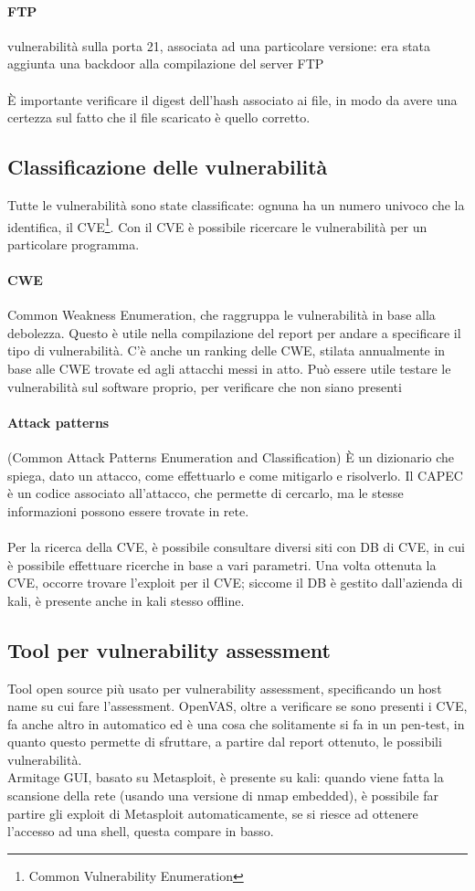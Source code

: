 \documentclass{article}
\begin{document}
\paragraph{FTP}vulnerabilità sulla porta 21, associata ad una particolare versione: era stata aggiunta una backdoor alla compilazione del server FTP
\\\\ È importante verificare il digest dell'hash associato ai file, in modo da avere una certezza sul fatto che il file scaricato è quello corretto.
\subsection{Classificazione delle vulnerabilità}
Tutte le vulnerabilità sono state classificate: ognuna ha un numero univoco che la identifica, il CVE\footnote{Common Vulnerability Enumeration}. Con il CVE è possibile ricercare le vulnerabilità per un particolare programma.
\paragraph{CWE} Common Weakness Enumeration, che raggruppa le vulnerabilità in base alla debolezza. Questo è utile nella compilazione del report per andare a specificare il tipo di vulnerabilità. C'è anche un ranking delle CWE, stilata annualmente in base alle CWE trovate ed agli attacchi messi in atto. Può essere utile testare le vulnerabilità sul software proprio, per verificare che non siano presenti
\paragraph{Attack patterns}
(Common Attack Patterns Enumeration and Classification) È un dizionario che spiega, dato un attacco, come effettuarlo e come mitigarlo e risolverlo. Il CAPEC è un codice associato all'attacco, che permette di cercarlo, ma le stesse informazioni possono essere trovate in rete.\\\\ Per la ricerca della CVE, è possibile consultare diversi siti con DB di CVE, in cui è possibile effettuare ricerche in base a vari parametri. Una volta ottenuta la CVE, occorre trovare l'exploit per il CVE; siccome il DB è gestito dall'azienda di kali, è presente anche in kali stesso offline.
\subsection{Tool per vulnerability assessment}
Tool open source più usato per vulnerability assessment, specificando un host name su cui fare l'assessment. OpenVAS, oltre a verificare se sono presenti i CVE, fa anche altro in automatico ed è una cosa che solitamente si fa in un pen-test, in quanto questo permette di sfruttare, a partire dal report ottenuto, le possibili vulnerabilità.\\ Armitage GUI, basato su Metasploit, è presente su kali: quando viene fatta la scansione della rete (usando una versione di nmap embedded), è possibile far partire gli exploit di Metasploit automaticamente, se si riesce ad ottenere l'accesso ad una shell, questa compare in basso.
\end{document}
